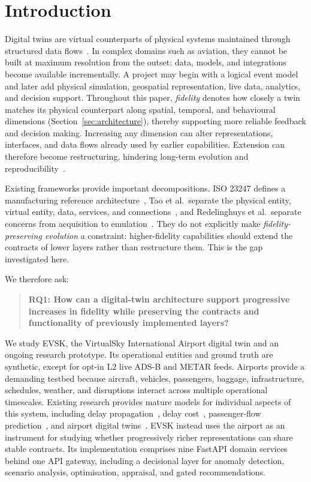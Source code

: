 \section{Introduction}\label{sec:introduction}

Digital twins are virtual counterparts of physical systems maintained through structured data flows~\cite{glaessgen2012,grieves2017}. In complex domains such as aviation, they cannot be built at maximum resolution from the outset: data, models, and integrations become available incrementally. A project may begin with a logical event model and later add physical simulation, geospatial representation, live data, analytics, and decision support. Throughout this paper, \emph{fidelity} denotes how closely a twin matches its physical counterpart along spatial, temporal, and behavioural dimensions (Section~\ref{sec:architecture}), thereby supporting more reliable feedback and decision making. Increasing any dimension can alter representations, interfaces, and data flows already used by earlier capabilities. Extension can therefore become restructuring, hindering long-term evolution and reproducibility~\cite{jones2020}.

Existing frameworks provide important decompositions. ISO 23247 defines a manufacturing reference architecture~\cite{iso23247}, Tao et al.\ separate the physical entity, virtual entity, data, services, and connections~\cite{tao2018}, and Redelinghuys et al.\ separate concerns from acquisition to emulation~\cite{redelinghuys2019}. They do not explicitly make \emph{fidelity-preserving evolution} a constraint: higher-fidelity capabilities should extend the contracts of lower layers rather than restructure them. This is the gap investigated here.

We therefore ask:

\begin{quote}
\textbf{RQ1: How can a digital-twin architecture support progressive increases in fidelity while preserving the contracts and functionality of previously implemented layers?}
\end{quote}

We study EVSK, the VirtualSky International Airport digital twin and an ongoing research prototype. Its operational entities and ground truth are synthetic, except for opt-in L2 live ADS-B and METAR feeds. Airports provide a demanding testbed because aircraft, vehicles, passengers, baggage, infrastructure, schedules, weather, and disruptions interact across multiple operational timescales. Existing research provides mature models for individual aspects of this system, including delay propagation~\cite{pyrgiotis2013}, delay cost~\cite{cook2009}, passenger-flow prediction~\cite{ke2017,schultz2019}, and airport digital twins~\cite{conde2024,palasca2025}. EVSK instead uses the airport as an instrument for studying whether progressively richer representations can share stable contracts. Its implementation comprises nine FastAPI domain services behind one API gateway, including a decisional layer for anomaly detection, scenario analysis, optimisation, appraisal, and gated recommendations.

